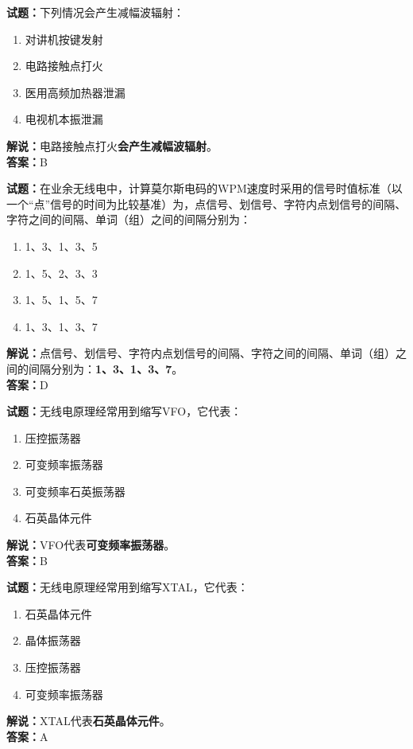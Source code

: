 \documentclass{ctexbook}
\begin{document}
\vspace{1em}

\textbf{试题：}下列情况会产生减幅波辐射：
\begin{enumerate}[leftmargin=3em]
  \item 对讲机按键发射
  \item 电路接触点打火
  \item 医用高频加热器泄漏
  \item 电视机本振泄漏
\end{enumerate}
\noindent\textbf{解说：}电路接触点打火\textbf{会产生减幅波辐射}。\\\noindent\textbf{答案：}B

\vspace{1em}

\textbf{试题：}在业余无线电中，计算莫尔斯电码的WPM速度时采用的信号时值标准（以一个“点”信号的时间为比较基准）为，点信号、划信号、字符内点划信号的间隔、字符之间的间隔、单词（组）之间的间隔分别为：
\begin{enumerate}[leftmargin=3em]
  \item 1、3、1、3、5
  \item 1、5、2、3、3
  \item 1、5、1、5、7
  \item 1、3、1、3、7
\end{enumerate}
\noindent\textbf{解说：}点信号、划信号、字符内点划信号的间隔、字符之间的间隔、单词（组）之间的间隔分别为：\textbf{1、3、1、3、7}。\\\noindent\textbf{答案：}D

\vspace{1em}

\textbf{试题：}无线电原理经常用到缩写VFO，它代表：
\begin{enumerate}[leftmargin=3em]
  \item 压控振荡器
  \item 可变频率振荡器
  \item 可变频率石英振荡器
  \item 石英晶体元件
\end{enumerate}
\noindent\textbf{解说：}VFO代表\textbf{可变频率振荡器}。\\\noindent\textbf{答案：}B

\vspace{1em}

\textbf{试题：}无线电原理经常用到缩写XTAL，它代表：
\begin{enumerate}[leftmargin=3em]
  \item 石英晶体元件
  \item 晶体振荡器
  \item 压控振荡器
  \item 可变频率振荡器
\end{enumerate}
\noindent\textbf{解说：}XTAL代表\textbf{石英晶体元件}。\\\noindent\textbf{答案：}A
\end{document}
